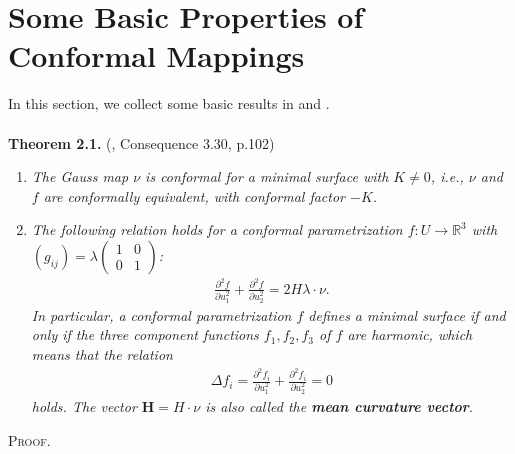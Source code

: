 \documentclass[a4paper]{article}
\numberwithin{equation}{section}
\begin{document}
\section{Some Basic Properties of Conformal Mappings}
In this section, we collect some basic results in \cite{1} and \cite{2}.\\
\\
\textbf{Theorem 2.1.} (\cite{1}, Consequence 3.30, p.102) 
\begin{enumerate}
\item \textit{The Gauss map $\nu$ is conformal for a minimal surface with $K\ne 0$, i.e., $\nu$ and $f$ are conformally equivalent, with conformal factor $-K$.}
\item \textit{The following relation holds for a conformal parametrization $f:U\to \mathbb{R}^3$ with $\left( {{g_{ij}}} \right) = \lambda \left( {\begin{array}{*{20}{c}}
1&0\\
0&1
\end{array}} \right)$:}
\begin{align}
\frac{{{\partial ^2}f}}{{\partial u_1^2}} + \frac{{{\partial ^2}f}}{{\partial u_2^2}} = 2H\lambda  \cdot \nu .
\end{align}
\textit{In particular, a conformal parametrization $f$ defines a minimal surface if and only if the three component functions $f_1,f_2,f_3$ of $f$ are harmonic, which means that the relation}
\begin{align}
\Delta {f_i} = \frac{{{\partial ^2}{f_i}}}{{\partial u_1^2}} + \frac{{{\partial ^2}{f_i}}}{{\partial u_2^2}} = 0
\end{align}
\textit{holds. The vector $\mathbf{H}=H\cdot \nu$ is also called the \textbf{mean curvature vector}.}
\end{enumerate}
\textsc{Proof.} 
\end{document}
